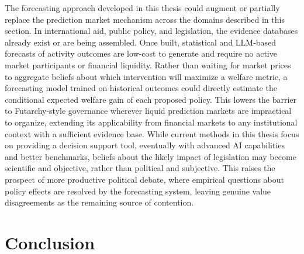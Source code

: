 \documentclass[12pt,a4paper]{article}
\begin{document}
The forecasting approach developed in this thesis could augment or partially replace the prediction market mechanism across the domains described in this section. In international aid, public policy, and legislation, the evidence databases already exist or are being assembled. Once built, statistical and LLM-based forecasts of activity outcomes are low-cost to generate and require no active market participants or financial liquidity. Rather than waiting for market prices to aggregate beliefs about which intervention will maximize a welfare metric, a forecasting model trained on historical outcomes could directly estimate the conditional expected welfare gain of each proposed policy. This lowers the barrier to Futarchy-style governance wherever liquid prediction markets are impractical to organize, extending its applicability from financial markets to any institutional context with a sufficient evidence base. While current methods in this thesis focus on providing a decision support tool, eventually with advanced AI capabilities and better benchmarks, beliefs about the likely impact of legislation may become scientific and objective, rather than political and subjective. This raises the prospect of more productive political debate, where empirical questions about policy effects are resolved by the forecasting system, leaving genuine value disagreements as the remaining source of contention.

\clearpage


\FloatBarrier
\section{Conclusion}
\end{document}
